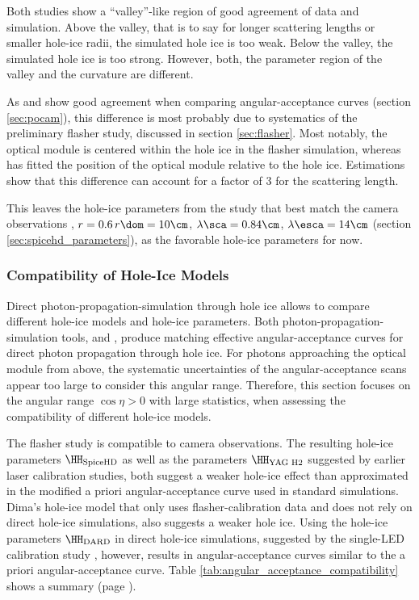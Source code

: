 Both studies show a ``valley''-like region of good agreement of data and simulation. Above the valley, that is to say for longer scattering lengths or smaller hole-ice radii, the simulated hole ice is too weak. Below the valley, the simulated hole ice is too strong. However, both, the parameter region of the valley and the curvature are different.

As \clsim and \ppc show good agreement when comparing angular-acceptance curves (section \ref{sec:pocam}), this difference is most probably due to systematics of the preliminary flasher study, discussed in section \ref{sec:flasher}. Most notably, the optical module is centered within the hole ice in the \clsim flasher simulation, whereas  has fitted the position of the optical module relative to the hole ice. Estimations show that this difference can account for a factor of $3$ for the scattering length.


This leaves the hole-ice parameters from the  study \cite{martinspicehddard} that best match the camera observations \cite{rongenswedishcamera}, $r = 0.6\,r\dom = 10\cm$, $\lambda\sca = 0.84\cm$, $\lambda\esca = 14\cm$ (section \ref{sec:spicehd_parameters}), as the favorable hole-ice parameters for now.
\subsubsection{Compatibility of Hole-Ice Models}
\label{sec:compatibility_of_hole_ice_parameters}

Direct photon-propagation-simulation through hole ice allows to compare different hole-ice models and hole-ice parameters.
Both photon-propagation-simulation tools, \ppc and \clsim, produce matching effective angular-acceptance curves for direct photon propagation through hole ice. For photons approaching the optical module from above, the systematic uncertainties of the \clsim angular-acceptance scans appear too large to consider this angular range. Therefore, this section focuses on the angular range $\cos \eta > 0$ with large statistics, when assessing the compatibility of different hole-ice models.

The  flasher study is compatible to camera observations. The resulting hole-ice parameters $\HH_\text{SpiceHD}$ as well as the parameters $\HH_\text{YAG H2}$ suggested by earlier laser calibration studies, both suggest a weaker hole-ice effect than approximated in the modified a priori angular-acceptance curve used in standard \clsim simulations. Dima's hole-ice model that only uses flasher-calibration data and does not rely on direct hole-ice simulations, also suggests a weaker hole ice. Using the hole-ice parameters $\HH_\text{DARD}$ in direct hole-ice simulations, suggested by the single-LED calibration study , however, results in angular-acceptance curves similar to the a priori angular-acceptance curve. Table \ref{tab:angular_acceptance_compatibility} shows a summary (page \pageref{tab:angular_acceptance_compatibility}).

